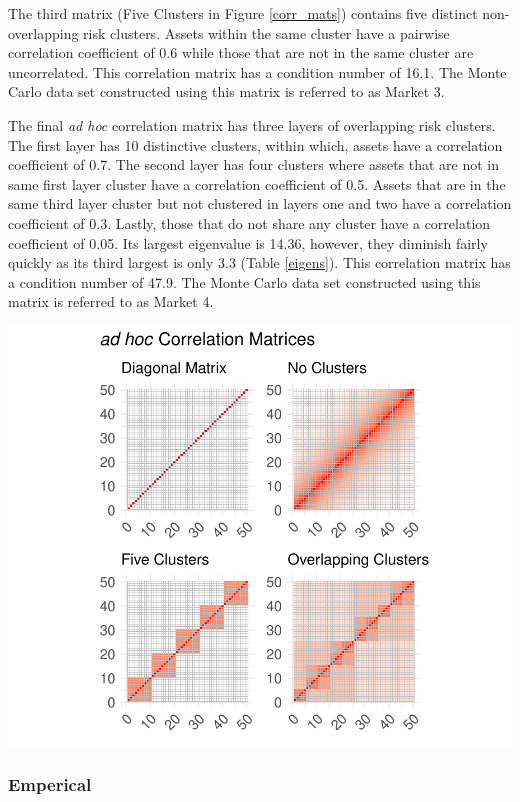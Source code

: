 \documentclass[11pt,preprint, authoryear]{elsarticle}
\let\origfigure\figure
\let\endorigfigure\endfigure
\renewenvironment{figure}[1][2] {
    \expandafter\origfigure\expandafter[H]
} {
    \endorigfigure
}
\numberwithin{equation}{section}
\numberwithin{figure}{section}
\numberwithin{table}{section}
\begin{document}
The third matrix (Five Clusters in Figure \ref{corr_mats}) contains five
distinct non-overlapping risk clusters. Assets within the same cluster
have a pairwise correlation coefficient of 0.6 while those that are not
in the same cluster are uncorrelated. This correlation matrix has a
condition number of 16.1. The Monte Carlo data set constructed using
this matrix is referred to as Market 3.

The final \emph{ad hoc} correlation matrix has three layers of
overlapping risk clusters. The first layer has 10 distinctive clusters,
within which, assets have a correlation coefficient of 0.7. The second
layer has four clusters where assets that are not in same first layer
cluster have a correlation coefficient of 0.5. Assets that are in the
same third layer cluster but not clustered in layers one and two have a
correlation coefficient of 0.3. Lastly, those that do not share any
cluster have a correlation coefficient of 0.05. Its largest eigenvalue
is 14.36, however, they diminish fairly quickly as its third largest is
only 3.3 (Table \ref{eigens}). This correlation matrix has a condition
number of 47.9. The Monte Carlo data set constructed using this matrix
is referred to as Market 4.

\begin{figure}
\centering
\includegraphics{Thesis_files/figure-latex/corr mats-1.pdf}
\caption{\label{corr_mats} Correlation Matrices}
\end{figure}

\hypertarget{emperical}{%
\subsubsection{\texorpdfstring{Emperical
\label{emp}}{Emperical }}\label{emperical}}
\end{document}
